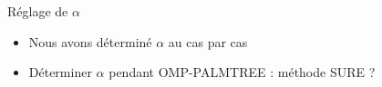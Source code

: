 \begin{frame}{Réglage de $\alpha$}
\begin{itemize}
\item Nous avons déterminé $\alpha$ au cas par cas
	\begin{figure}\centering
	\end{figure}
\item Déterminer $\alpha$ pendant OMP-PALMTREE : méthode SURE \cite{eldar_generalized_2009} ?
\end{itemize}
\end{frame}

